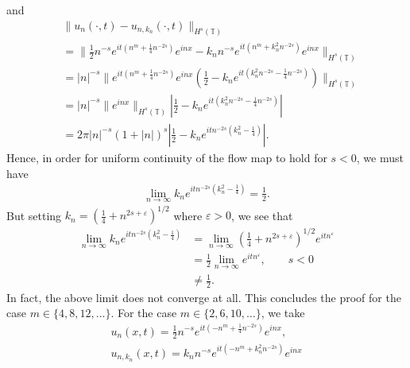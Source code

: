 \documentclass[12pt,reqno]{amsart}
\numberwithin{equation}{section}  %
\numberwithin{figure}{section}
\newcommand{\ci}{\mathbb{T}}
\newcommand{\ee}{\varepsilon}
\theoremstyle{plain}
\theoremstyle{definition}
\theoremstyle{remark}
\begin{document}
%
%
and
%
%
\begin{equation*}
	\begin{split}
		& \|u_{n}(\cdot, t) - u_{n, k_{n}}(\cdot, t) \|_{H^{s}(\ci)}
		\\
		& = \|\frac{1}{2}n^{-s}e^{it\left( n^{m} + \frac{1}{4}n^{-2s}
		\right)}e^{inx} - k_{n}n^{-s}e^{it\left( n^{m} + k_{n}^{2}n^{-2s}
		\right)}e^{inx} \|_{H^{s}(\ci)}
		\\
		& = | n |^{-s} \|e^{it\left( n^{m} + \frac{1}{4}n^{-2s}
		\right)}e^{inx}\left( \frac{1}{2} - k_{n}e^{it\left(
		k_{n}^{2}n^{-2s}-\frac{1}{4}n^{-2s} \right)} \right)\|_{H^{s}(\ci)}
		\\
		& = | n|^{-s} \|e^{inx} \|_{H^{s}(\ci)}
    | \frac{1}{2} - k_{n}e^{it\left(
    k_{n}^{2}n^{-2s} - \frac{1}{4}n^{-2s} \right )}|
		\\
    & = 2 \pi | n |^{-s} (1 + | n |)^{s} | \frac{1}{2} - k_{n}e^{itn^{-2s}\left(
    k_{n}^{2}- \frac{1}{4}\right)} |.
	\end{split}
\end{equation*}
%
%
Hence, in order for uniform continuity of the flow map to hold for $s < 0$, we must have
%
%
\begin{equation*}
	\begin{split}
		\lim_{n \to \infty}  k_{n} e^{itn^{-2s}\left( k_{n}^{2} -
		\frac{1}{4} \right)}  = \frac{1}{2}.
	\end{split}
\end{equation*}
%
%
But setting $k_{n} = \left( \frac{1}{4} + n^{2s + \ee} \right)^{1/2}$ where  $\ee >
0$, we see that 
%
%
\begin{equation*}
	\begin{split}
		\lim_{n \to \infty} k_{n} e^{itn^{-2s}\left( k_{n}^{2} - \frac{1}{4}
		\right)}
    & = \lim_{n \to \infty} \left( \frac{1}{4} + n^{2s + \ee} \right)^{1/2}
    e^{itn^{\ee}} \\ & = \frac{1}{2} \lim_{n \to \infty} e^{itn^{\ee}}, \qquad s
    < 0
    \\
    & \neq \frac{1}{2}.
	\end{split}
\end{equation*}
%
%
In fact, the above limit does not converge at all. This concludes the proof for
the case $m \in \{4, 8, 12, \dots \}$. For the case $m \in \{2, 6, 10, \dots \}$, we take
%
%
\begin{equation*}
	\begin{split}
		u_{n}(x,t) = \frac{1}{2}n^{-s}e^{it\left( -n^{m} + \frac{1}{4}n^{-2s}
		\right)}e^{inx},
		\\ u_{n, k_{n}}(x,t) = k_{n}n^{-s}e^{it\left( -n^{m} + k_{n}^{2}n^{-2s}
		\right)}e^{inx} 
	\end{split}
\end{equation*}
\end{document}
